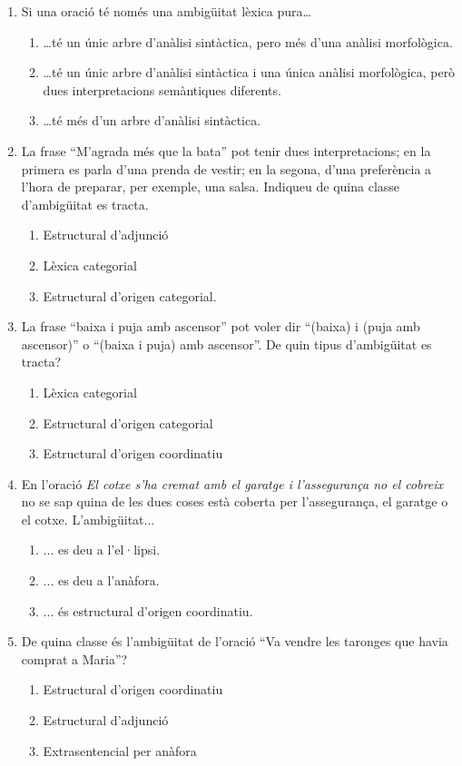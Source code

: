 \begin{enumerate}
\item Si una oració té només una ambigüitat
lèxica pura\ldots
 \begin{enumerate}
 \item \ldots té un únic arbre d'anàlisi sintàctica,
 pero més d'una anàlisi morfològica.
 \item \ldots té un únic arbre d'anàlisi sintàctica i una
única anàlisi morfològica, però 
dues interpretacions se\-màn\-ti\-ques diferents.
 \item \ldots té més d'un arbre d'anàlisi sintàctica.
 \end{enumerate}

\item La frase ``M'agrada més que la bata''
pot tenir dues interpretacions; en la primera es parla d'una prenda de
vestir; en la segona, d'una preferència a l'hora de preparar, per exemple,
una salsa. Indiqueu de quina classe d'ambigüitat es tracta.
\begin{enumerate}
\item Estructural d'adjunció
\item Lèxica categorial
\item Estructural d'origen categorial.
\end{enumerate}

\item La frase ``baixa i puja amb ascensor'' pot voler dir 
``(baixa) i (puja amb ascensor)'' o ``(baixa i puja) amb ascensor''.
De quin tipus d'ambigüitat es tracta?
\begin{enumerate}
\item Lèxica categorial
\item Estructural d'origen categorial
\item Estructural d'origen coordinatiu
\end{enumerate}

\item En l'oració \emph{El cotxe s'ha cremat amb el garatge i
    l'assegurança no el cobreix} no se sap quina de les dues coses
  està coberta per l'assegurança, el garatge o el cotxe. L'ambigüitat...
\begin{enumerate}
\item ... es deu a l'el·lipsi.
\item ... es deu a l'anàfora.
\item ... és estructural d'origen coordinatiu.
\end{enumerate}

\item De quina classe és l'ambigüitat de l'oració ``Va vendre les taronges
que havia comprat a Maria''?
\begin{enumerate}
\item Estructural d'origen coordinatiu
\item Estructural d'adjunció
\item Extrasentencial per anàfora
\end{enumerate}


\end{enumerate}
